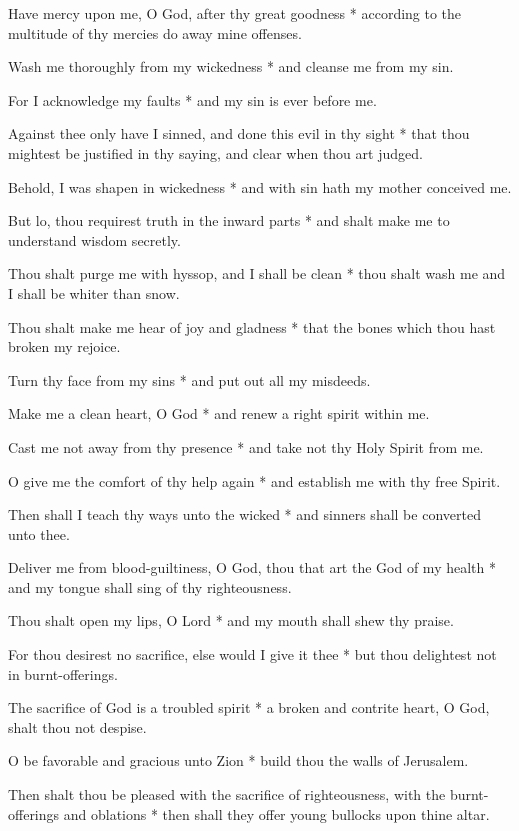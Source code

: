 Have mercy upon me, O God, after thy great goodness * according to the multitude of thy mercies do away mine offenses.
	
Wash me thoroughly from my wickedness * and cleanse me from my sin.
	
For I acknowledge my faults * and my sin is ever before me.
	
Against thee only have I sinned, and done this evil in thy sight * that thou mightest be justified in thy saying, and clear when thou art judged.

Behold, I was shapen in wickedness * and with sin hath my mother conceived me.
	
But lo, thou requirest truth in the inward parts * and shalt make me to understand wisdom secretly.
	
Thou shalt purge me with hyssop, and I shall be clean * thou shalt wash me and I shall be whiter than snow.
	
Thou shalt make me hear of joy and gladness * that the bones which thou hast broken my rejoice.
	
Turn thy face from my sins * and put out all my misdeeds.
	
Make me a clean heart, O God * and renew a right spirit within me.
	
Cast me not away from thy presence * and take not thy Holy Spirit from me.
	
O give me the comfort of thy help again * and establish me with thy free Spirit.
	
Then shall I teach thy ways unto the wicked * and sinners shall be converted unto thee.
	
Deliver me from blood-guiltiness, O God, thou that art the God of my health * and my tongue shall sing of thy righteousness.
	
Thou shalt open my lips, O Lord * and my mouth shall shew thy praise.
	
For thou desirest no sacrifice, else would I give it thee * but thou delightest not in burnt-offerings.
	
The sacrifice of God is a troubled spirit * a broken and contrite heart, O God, shalt thou not despise.
	
O be favorable and gracious unto Zion * build thou the walls of Jerusalem.
	
Then shalt thou be pleased with the sacrifice of righteousness, with the burnt-offerings and oblations * then shall they offer young bullocks upon thine altar.
